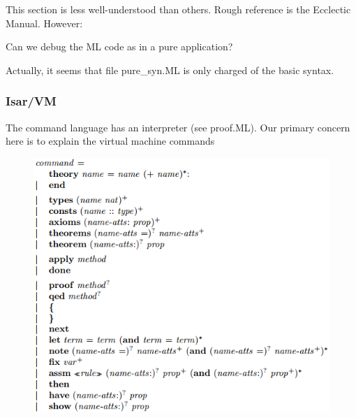 This section is less well-understood than others. Rough reference is the Ecclectic Manual. However:

Can we debug the ML code as in a pure application?

Actually, it seems that file pure\_syn.ML is only charged of the basic syntax. 

\subsubsection{Isar/VM}

The command language has an interpreter (see proof.ML). Our primary concern here is to explain the virtual machine commands

\begin{figure}
	\includegraphics[scale=0.65]{img/commands.png}
\end{figure}










